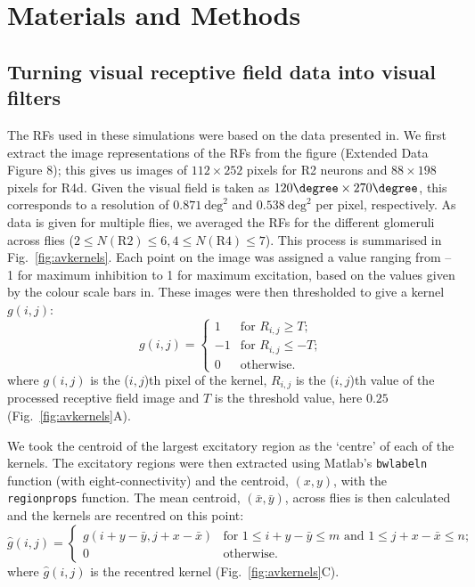 
\section*{Materials and Methods}
\subsection{Turning visual receptive field data into visual filters}
\label{sec:methods:preprocessing}
The RFs used in these simulations were based on the data presented in\cite{Seelig2013}.
We first extract the image representations of the RFs from the figure (Extended Data Figure 8); this gives us images of $112\times 252$ pixels for R2 neurons and $88\times 198$ pixels for R4d.
Given the visual field is taken as $120\degree\times 270\degree$, this corresponds to a resolution of $0.871~\mathrm{deg}^2$ and $0.538~\mathrm{deg}^2$ per pixel, respectively.
As data is given for multiple flies, we averaged the RFs for the different glomeruli across flies ($2\le N(\mathrm{R2}) \le 6, 4\le N(\mathrm{R4})\le 7$). This process is summarised in Fig.~\ref{fig:avkernels}. Each point on the image was assigned a value ranging from --1 for maximum inhibition to 1 for maximum excitation, based on the values given by the colour scale bars in\cite{Seelig2013}.
These images were then thresholded to give a kernel $g(i,j)$:
$$
g(i,j) = \left\{ \begin{array}{rl}
		   1 & \mbox{for } R_{i,j} \ge T; \\
                  -1 & \mbox{for } R_{i,j} \le -T; \\
                   0 & \mbox{otherwise.}
                  \end{array}
          \right.
$$
where $g(i,j)$ is the ($i,j$)th pixel of the kernel, $R_{i,j}$ is the ($i,j$)th value of the processed receptive field image and $T$ is the threshold value, here $0.25$ (Fig.~\ref{fig:avkernels}A).

We took the centroid of the largest excitatory region as the `centre' of each of the kernels.
The excitatory regions were then extracted using Matlab's \texttt{bwlabeln} function (with eight-connectivity) and the centroid, $(x,y)$, with the \texttt{regionprops} function.
The mean centroid, $(\bar{x},\bar{y})$, across flies is then calculated and the kernels are recentred on this point:
$$
\hat{g}(i,j) = \left\{ \begin{array}{ll} g(i+y-\bar{y},j+x-\bar{x}) & \mbox{for } 1\le i+y-\bar{y}\le m \mbox{ and } 1\le j+x-\bar{x}\le n;\\
0 & \mbox{otherwise.} \end{array} \right.
$$
where $\hat{g}(i,j)$ is the recentred kernel (Fig.~\ref{fig:avkernels}C).

